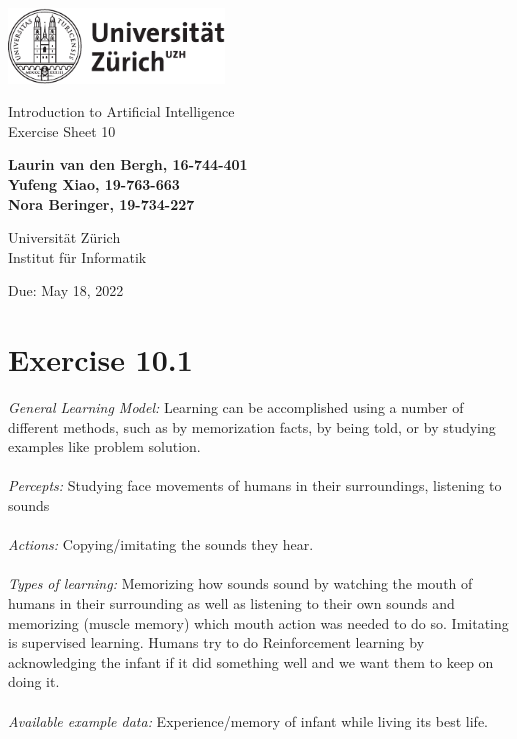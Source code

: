\documentclass[12pt]{article}
\begin{document}
\begin{titlepage}
\includegraphics[height=20mm]{../images/uzh_logo}\\

\begin{flushleft}

\vspace{2cm}

{\Large Introduction to Artificial Intelligence\\Exercise Sheet 10}\\

\vspace{4cm}

\textbf{Laurin van den Bergh, 16-744-401\\Yufeng Xiao, 19-763-663\\Nora Beringer, 19-734-227}\\

\vspace{2cm}

Universität Zürich\\
Institut für Informatik

\vfill Due: May 18, 2022

\vspace{3cm}


\end{flushleft}
\end{titlepage}

\newpage

\section*{Exercise 10.1}
\emph{General Learning Model:} Learning can be accomplished using a number of different methods, such as by memorization facts, by being told, or by studying examples like problem solution.\\\\
\emph{Percepts:} Studying face movements of humans in their surroundings, listening to sounds\\\\
\emph{Actions:} Copying/imitating the sounds they hear.\\\\
\emph{Types of learning:} Memorizing how sounds sound by watching the mouth of humans in their surrounding as well as listening to their own sounds and memorizing (muscle memory) which mouth action was needed to do so. Imitating is supervised learning. Humans try to do Reinforcement learning by acknowledging the infant if it did something well and we want them to keep on doing it.\\\\
\emph{Available example data:} Experience/memory of infant while living its best life.
\end{document}
